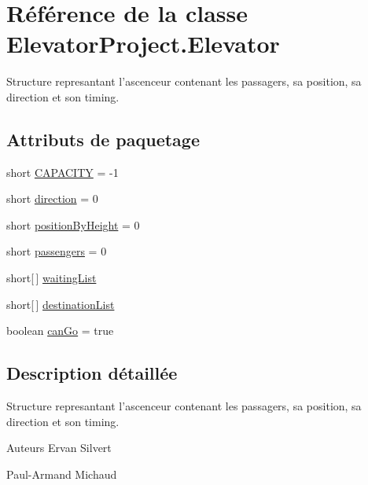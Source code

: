 \hypertarget{classElevatorProject_1_1Elevator}{\section{Référence de la classe Elevator\-Project.\-Elevator}
\label{classElevatorProject_1_1Elevator}
}


Structure represantant l'ascenceur contenant les passagers, sa position, sa direction et son timing.  


\subsection*{Attributs de paquetage}
\begin{DoxyCompactItemize}
\item 
short \hyperlink{classElevatorProject_1_1Elevator_a6b1b4fd53429ce2e9f4047cf026a6218}{C\-A\-P\-A\-C\-I\-T\-Y} = -\/1
\item 
short \hyperlink{classElevatorProject_1_1Elevator_a3b93476cc71554678cba7f56f4615d1e}{direction} = 0
\item 
short \hyperlink{classElevatorProject_1_1Elevator_ab1b368c5ffad580c3693bd7ada72285a}{position\-By\-Height} = 0
\item 
short \hyperlink{classElevatorProject_1_1Elevator_a7e09eed6c6786dc1c184825738724d63}{passengers} = 0
\item 
short\mbox{[}$\,$\mbox{]} \hyperlink{classElevatorProject_1_1Elevator_a1a2cb5a9024a1aa576f3c41637eac36f}{waiting\-List}
\item 
short\mbox{[}$\,$\mbox{]} \hyperlink{classElevatorProject_1_1Elevator_a8e4d006bcb17368a9c3a8c2f18acb91f}{destination\-List}
\item 
boolean \hyperlink{classElevatorProject_1_1Elevator_a2a47e86af463e763196484a9e0a51a2f}{can\-Go} = true
\end{DoxyCompactItemize}


\subsection{Description détaillée}
Structure represantant l'ascenceur contenant les passagers, sa position, sa direction et son timing. 

\begin{DoxyAuthor}{Auteurs}
Ervan Silvert 

Paul-\/\-Armand Michaud 
\end{DoxyAuthor}


